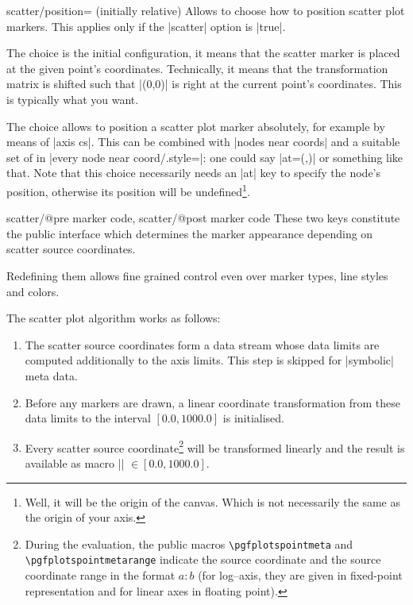 {\begin{pgfplotskey}{scatter/position= (initially relative)}
	Allows to choose how to position scatter plot markers. This applies only if the |scatter| option is |true|.

	The choice  is the initial configuration, it means that the scatter marker is placed at the given point's coordinates. Technically, it means that the transformation matrix is shifted such that |(0,0)| is right at the current point's coordinates. This is typically what you want.

	The choice  allows to position a scatter plot marker absolutely, for example by means of |axis cs|. This can be combined with |nodes near coords| and a suitable set of  in |every node near coord/.style=|: one could say |at={(\coordindex,)}| or something like that. Note that this choice necessarily needs an |at| key to specify the node's position, otherwise its position will be undefined\footnote{Well, it will be the origin of the canvas. Which is not necessarily the same as the origin of your axis.}. 
	
\end{pgfplotskey}

\begin{pgfplotsxycodekeylist}{
	scatter/@pre marker code,
	scatter/@post marker code}
	These two keys constitute the public interface which determines the marker appearance depending on scatter source coordinates.

	Redefining them allows fine grained control even over marker types, line styles and colors.

	The scatter plot algorithm works as follows:
\begin{enumerate} 
\item The scatter source coordinates form a data stream whose data limits are computed additionally to the axis limits. This step is skipped for |symbolic| meta data.
\item Before any markers are drawn, a linear coordinate transformation from these data limits to the interval $[0.0,1000.0]$ is initialised. 
\item Every scatter source coordinate\footnote{During the evaluation, the public macros \texttt{\textbackslash pgfplotspointmeta} and \texttt{\textbackslash pgfplotspointmetarange} indicate the source coordinate and the source coordinate range in the format $a:b$ (for log--axis, they are given in fixed-point representation and for linear axes in floating point).} will be transformed linearly and the result is available as macro |\pgfplotspointmetatransformed| $ \in [0.0,1000.0]$.


\end{enumerate}
\end{pgfplotsxycodekeylist}}
